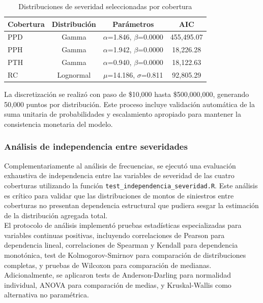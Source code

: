 \begin{table}[H]
\centering
\caption{Distribuciones de severidad seleccionadas por cobertura}
\begin{tabular}{lccc}
\hline
\textbf{Cobertura} & \textbf{Distribución} & \textbf{Parámetros} & \textbf{AIC} \\
\hline
PPD & Gamma & $\alpha$=1.846, $\beta$=0.0000 & 455,495.07 \\
PPH & Gamma & $\alpha$=1.942, $\beta$=0.0000 & 18,226.28 \\
PTH & Gamma & $\alpha$=0.940, $\beta$=0.0000 & 18,122.63 \\
RC & Lognormal & $\mu$=14.186, $\sigma$=0.811 & 92,805.29 \\
\hline
\end{tabular}
\end{table}

La discretización se realizó con paso de \$10,000 hasta \$500,000,000, generando 50,000 puntos por distribución. Este proceso incluye validación automática de la suma unitaria de probabilidades y escalamiento apropiado para mantener la consistencia monetaria del modelo.

\subsubsection{Análisis de independencia entre severidades}

Complementariamente al análisis de frecuencias, se ejecutó una evaluación exhaustiva de independencia entre las variables de severidad de las cuatro coberturas utilizando la función \texttt{test\_independencia\_severidad.R}. Este análisis es crítico para validar que las distribuciones de montos de siniestros entre coberturas no presentan dependencia estructural que pudiera sesgar la estimación de la distribución agregada total.\\

El protocolo de análisis implementó pruebas estadísticas especializadas para variables continuas positivas, incluyendo correlaciones de Pearson para dependencia lineal, correlaciones de Spearman y Kendall para dependencia monotónica, test de Kolmogorov-Smirnov para comparación de distribuciones completas, y pruebas de Wilcoxon para comparación de medianas. Adicionalmente, se aplicaron tests de Anderson-Darling para normalidad individual, ANOVA para comparación de medias, y Kruskal-Wallis como alternativa no paramétrica.

